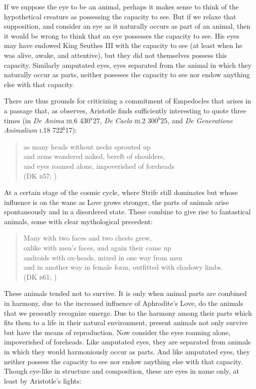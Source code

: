 If we suppose the eye to be an animal, perhaps it makes sense to think of the hypothetical creature as possessing the capacity to see. But if we relaxe that supposition, and consider an eye as it naturally occurs as part of an animal, then it would be wrong to think that an eye possesses the capacity to see. His eyes may have endowed King Seuthes III with the capacity to see (at least when he was alive, awake, and attentive), but they did not themselves possess this capacity. Similarly amputated eyes, eyes separated from the animal in which they naturally occur as parts, neither posesses the capacity to see nor endow anything else with that capacity. 

There are thus grounds for criticizing a commitment of Empedocles that arises in a passage that, as \citet[211]{Wright:1981zr} observes, Aristotle finds sufficiently interesting to quote three times (in \emph{De Anima} \textsc{iii}.6 430\( ^{a} \)27, \emph{De Caelo} \textsc{iii}.2 300\( ^{b} \)25, and \emph{De Generatione Animalium} \textsc{i}.18 722\( ^{b} \)17):
\begin{verse}
	as many heads without necks sprouted up\\
	and arms wandered naked, bereft of shoulders,\\
	and eyes roamed alone, impoverished of foreheads\\
	(DK \textsc{b}57; \citealt[64 245]{Inwood:2001ve})
\end{verse}
At a certain stage of the cosmic cycle, where Strife still dominates but whose influence is on the wane as Love grows stronger, the parts of animals arise spontaneously and in a disordered state. These combine to give rise to fantastical animals, some with clear mythological precedent:
\begin{verse}
	Many with two faces and two chests grew,\\
	oxlike with men's faces, and again their came up\\
	androids with ox-heads, mixed in one way from men\\
	and in another way in female form, outfitted with shadowy limbs.\\
	(DK \textsc{b}61; \citealt[66 247]{Inwood:2001ve})
\end{verse}
These animals tended not to survive. It is only when animal parts are combined in harmony, due to the increased influence of Aphrodite's Love, do the animals that we presently recognize emerge. Due to the harmony among their parts which fits them to a life in their natural environment, present animals not only survive but have the means of reproduction. Now consider the eyes roaming alone, impoverished of foreheads. Like amputated eyes, they are separated from animals in which they would harmoniously occur as parts. And like amputated eyes, they neither possess the capacity to see nor endow anything else with that capacity. Though eye-like in structure and composition, these are eyes in name only, at least by Aristotle's lights:
